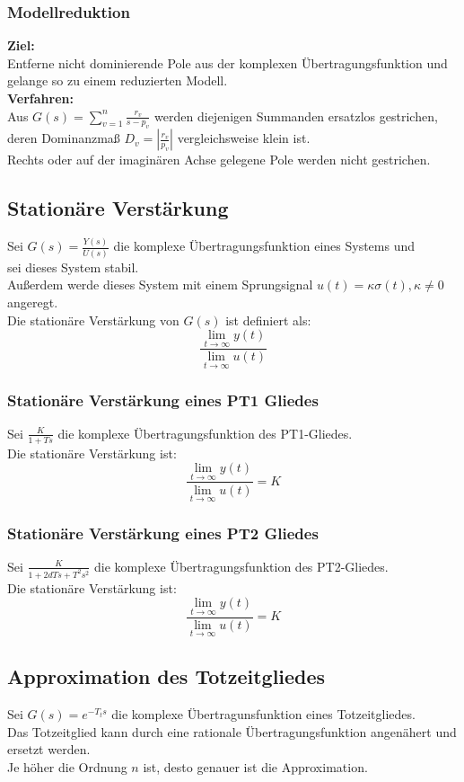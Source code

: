 \documentclass[10pt,a4paper]{article}
\begin{document}
\subsubsection{Modellreduktion}
\textbf{Ziel:} \\
Entferne nicht dominierende Pole aus der komplexen Übertragungsfunktion und gelange so zu einem reduzierten Modell. \\

\textbf{Verfahren:} \\
Aus $G(s) = \sum_{v = 1}^n \frac{r_v}{s - p_v}$ werden diejenigen Summanden ersatzlos gestrichen, deren Dominanzmaß $D_v = |\frac{r_v}{p_v}|$ vergleichsweise klein ist. \\
Rechts oder auf der imaginären Achse gelegene Pole werden nicht gestrichen.

\subsection{Stationäre Verstärkung}
Sei $G(s) = \frac{Y(s)}{U(s)}$ die komplexe Übertragungsfunktion eines Systems und \\
sei dieses System stabil. \\
Außerdem werde dieses System mit einem Sprungsignal $u(t) = \kappa \sigma(t), \kappa ≠ 0$ angeregt. \\
Die stationäre Verstärkung von $G(s)$ ist definiert als:
$$
	\frac{\lim_{t → ∞} y(t)}{\lim_{t → ∞} u(t)}
$$

\subsubsection{Stationäre Verstärkung eines PT1 Gliedes}
Sei $\frac{K}{1 + Ts}$ die komplexe Übertragungsfunktion des PT1-Gliedes. \\
Die stationäre Verstärkung ist:
$$
	\frac{\lim_{t → ∞} y(t)}{\lim_{t → ∞} u(t)} = K
$$

\subsubsection{Stationäre Verstärkung eines PT2 Gliedes}
Sei $\frac{K}{1 + 2dTs + T^2 s^2}$ die komplexe Übertragungsfunktion des PT2-Gliedes. \\
Die stationäre Verstärkung ist:
$$
	\frac{\lim_{t → ∞} y(t)}{\lim_{t → ∞} u(t)} = K
$$

\subsection{Approximation des Totzeitgliedes}
Sei $G(s) = e^{-T_t s}$ die komplexe Übertragunsfunktion eines Totzeitgliedes. \\
Das Totzeitglied kann durch eine rationale Übertragungsfunktion angenähert und ersetzt werden. \\
Je höher die Ordnung $n$ ist, desto genauer ist die Approximation.
\end{document}
